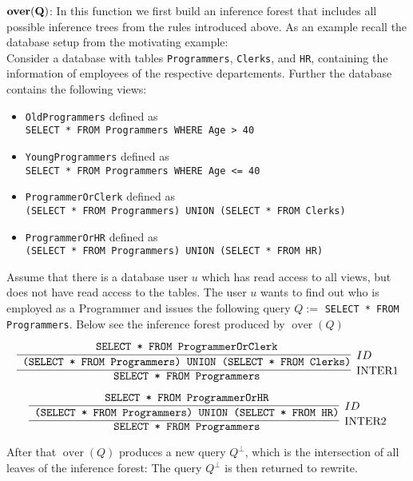 {{\smallskip
\noindent
{$\mathbf{ \mathrm{\bf over}(Q)}$:}
%
In this function we first build an inference forest that includes all possible inference trees from the rules introduced above. 
%
As an example recall the database setup from the motivating example:
\\
Consider a database with tables \texttt{Programmers}, \texttt{Clerks}, and \texttt{HR}, containing the information of employees of the respective departements.
%
Further the database contains the following views:
\begin{itemize}
	\item \texttt{OldProgrammers} defined as \\ \texttt{SELECT * FROM Programmers WHERE Age > 40}
	\item \texttt{YoungProgrammers} defined as \\ \texttt{SELECT * FROM Programmers WHERE Age <= 40}
	\item \texttt{ProgrammerOrClerk} defined as \\ \texttt{(SELECT * FROM Programmers) UNION (SELECT * FROM Clerks)}
	\item \texttt{ProgrammerOrHR} defined as \\ \texttt{(SELECT * FROM Programmers) UNION (SELECT * FROM HR)}
\end{itemize}
%
Assume that there is a database user $u$ which has read access to all views, but does not have read access to the tables.
%
The user $u$ wants to find out who is employed as a Programmer and issues the following query $Q := $ \texttt{SELECT * FROM Programmers}. 
%
Below see the inference forest produced by $\operatorname{over}(Q)$

\[
\infer[\text{INTER1}]
	{\text{\texttt{ SELECT * FROM Programmers}}}
	{
		\infer[ID]
		{\text{\texttt{ (SELECT * FROM Programmers) UNION (SELECT * FROM Clerks)}}}
		{\text{\texttt{ SELECT * FROM ProgrammerOrClerk}}}
	}
\]

\[
\infer[\text{INTER2}]
	{\text{\texttt{ SELECT * FROM Programmers}}}
	{
		\infer[ID]
		{\text{\texttt{ (SELECT * FROM Programmers) UNION (SELECT * FROM HR)}}}
		{\text{\texttt{ SELECT * FROM ProgrammerOrHR}}}
	}	
\]

After that $\operatorname{over}(Q)$ produces a new query $Q^\bot$, which is the intersection of all leaves of the inference forest: 
%
The query $Q^\bot$ is then returned to rewrite.

}}

